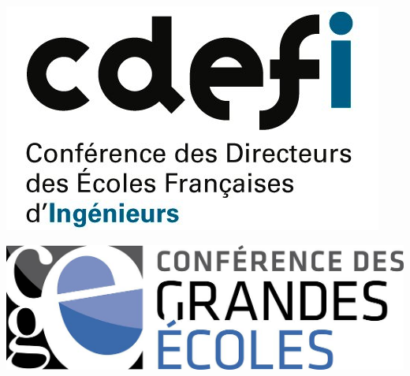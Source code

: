 \documentclass[a4paper]{book}
\begin{document}
\begin{minipage}[c]{1.09in}
  \includegraphics[width=1\linewidth]{logos/cdefi.png}
\end{minipage}\hfill
\begin{minipage}[c]{1.17in}
  \includegraphics[width=1\linewidth]{logos/cge.png}
\end{minipage}\hfill
\end{document}
